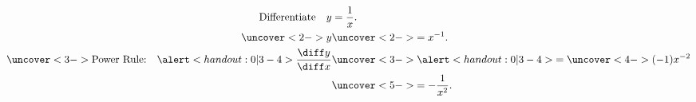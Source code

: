 \begin{frame}
\begin{example}
\abovedisplayskip=0pt
\belowdisplayskip=-15pt
\abovedisplayshortskip=0pt
\belowdisplayshortskip=0pt
\begin{align*}
\text{Differentiate}\quad y & = \frac{1}{x}.\\%
\uncover<2->{%
y %
}%
& \uncover<2->{%
 = x^{-1}.
}\\%
\uncover<3->{%
\text{Power Rule:}\quad %
\alert<handout:0| 3-4>{\frac{\diff y}{\diff x}} %
}%
& \uncover<3->{%
\alert<handout:0| 3-4>{ = \uncover<4->{(-1)x^{-2}}}
}\\%
& \uncover<5->{%
 =  -\frac{1}{x^2}.%
}%
\end{align*}
\end{example}
\end{frame}
